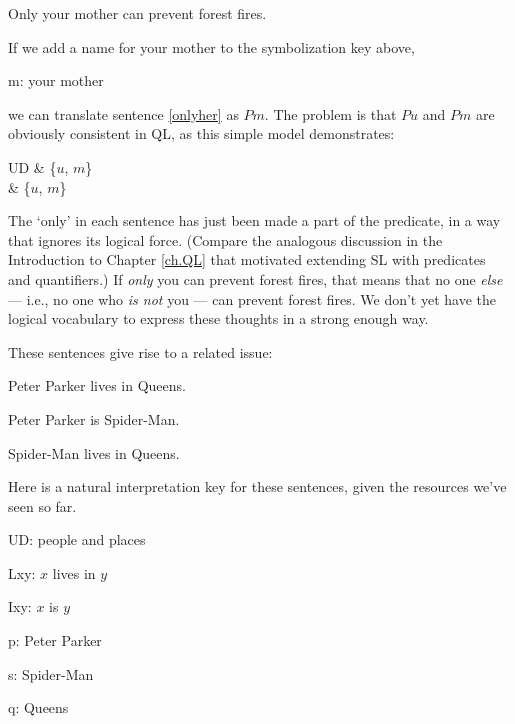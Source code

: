 \begin{earg}
\item[\ex{onlyher}] Only your mother can prevent forest fires.
\end{earg}

If we add a name for your mother to the symbolization key above,

\begin{ekey}
\item[m:] your mother
\end{ekey}

we can translate sentence \ref{onlyher} as $Pm$. The problem is that $Pu$ and $Pm$ are obviously consistent in QL, as this simple model demonstrates:

\begin{partialmodel}
	UD & \{$u$, $m$\}\\
	 & \{$u$, $m$\}
\end{partialmodel}

The `only' in each sentence has just been made a part of the predicate, in a way that ignores its logical force. (Compare the analogous discussion in the Introduction to Chapter \ref{ch.QL} that motivated extending SL with predicates and quantifiers.) If \emph{only} you can prevent forest fires, that means that no one \emph{else} --- i.e., no one who \emph{is not} you --- can prevent forest fires. We don't yet have the logical vocabulary to express these thoughts in a strong enough way.

These sentences give rise to a related issue:

\begin{earg}
\item[\ex{ppq}] Peter Parker lives in Queens.
\item[\ex{pps}] Peter Parker is Spider-Man.
\item[\ex{sq}] Spider-Man lives in Queens.
\end{earg}

Here is a natural interpretation key for these sentences, given the resources we've seen so far.

\begin{ekey}
\item[UD:] people and places
\item[Lxy:] $x$ lives in $y$
\item[Ixy:] $x$ is $y$
\item[p:] Peter Parker
\item[s:] Spider-Man
\item[q:] Queens
\end{ekey}

